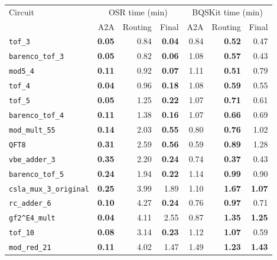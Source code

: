 
\begin{table}[p]
\centering
\scriptsize
\begin{tabular}{l|rrr|rrr}
\hline
Circuit & \multicolumn{3}{c|}{OSR time (min)} & \multicolumn{3}{c}{BQSKit time (min)} \\
 & A2A & Routing & Final & A2A & Routing & Final \\
\hline
\texttt{tof\_3} & \textbf{0.05} & 0.84 & \textbf{0.04} & 0.84 & \textbf{0.52} & 0.47 \\
\texttt{barenco\_tof\_3} & \textbf{0.05} & 0.82 & \textbf{0.06} & 1.08 & \textbf{0.57} & 0.43 \\
\texttt{mod5\_4} & \textbf{0.11} & 0.92 & \textbf{0.07} & 1.11 & \textbf{0.51} & 0.79 \\
\texttt{tof\_4} & \textbf{0.04} & 0.96 & \textbf{0.18} & 1.08 & \textbf{0.59} & 0.55 \\
\texttt{tof\_5} & \textbf{0.05} & 1.25 & \textbf{0.22} & 1.07 & \textbf{0.71} & 0.61 \\
\texttt{barenco\_tof\_4} & \textbf{0.11} & 1.38 & \textbf{0.16} & 1.07 & \textbf{0.66} & 0.69 \\
\texttt{mod\_mult\_55} & \textbf{0.14} & 2.03 & \textbf{0.55} & 0.80 & \textbf{0.76} & 1.02 \\
\texttt{QFT8} & \textbf{0.31} & 2.59 & \textbf{0.56} & 0.59 & \textbf{0.89} & 1.28 \\
\texttt{vbe\_adder\_3} & \textbf{0.35} & 2.20 & \textbf{0.24} & 0.74 & \textbf{0.37} & 0.43 \\
\texttt{barenco\_tof\_5} & \textbf{0.24} & 1.94 & \textbf{0.22} & 1.14 & \textbf{0.99} & 0.90 \\
\texttt{csla\_mux\_3\_original} & \textbf{0.25} & 3.99 & 1.89 & 1.10 & \textbf{1.67} & \textbf{1.07} \\
\texttt{rc\_adder\_6} & \textbf{0.10} & 4.27 & \textbf{0.24} & 0.76 & \textbf{0.97} & 0.71 \\
\texttt{gf2\textasciicircum{}E4\_mult} & \textbf{0.04} & 4.11 & 2.55 & 0.87 & \textbf{1.35} & \textbf{1.25} \\
\texttt{tof\_10} & \textbf{0.08} & 3.14 & \textbf{0.23} & 1.12 & \textbf{1.07} & 0.59 \\
\texttt{mod\_red\_21} & \textbf{0.11} & 4.02 & 1.47 & 1.49 & \textbf{1.23} & \textbf{1.43} \\

\end{tabular}
\end{table}
